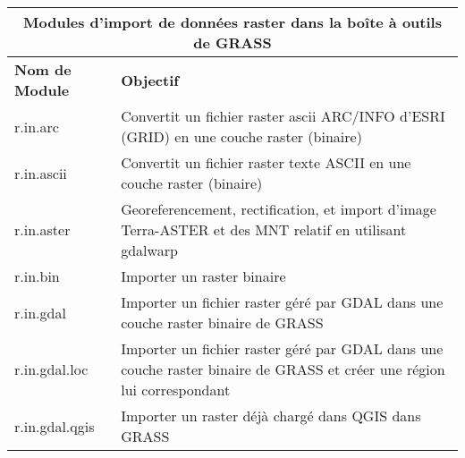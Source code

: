 \begin{table}[H]
\centering
 \begin{tabular}{|p{3cm}|p{11cm}|}
  \hline \multicolumn{2}{|c|}{\textbf{Modules d'import de données raster dans la boîte à outils de GRASS}} \\ 
  \hline \textbf{Nom de Module} & \textbf{Objectif} \\
   \hline r.in.arc & Convertit un fichier raster ascii ARC/INFO d'ESRI (GRID) en une couche raster (binaire) \\
  \hline r.in.ascii & Convertit un fichier raster texte ASCII en une couche raster (binaire)\\
  \hline r.in.aster & Georeferencement, rectification, et import d'image Terra-ASTER et des MNT relatif en utilisant gdalwarp \\
   \hline r.in.bin & Importer un raster binaire \\
   \hline r.in.gdal &  Importer un fichier raster géré par GDAL dans une couche raster binaire de GRASS\\
  \hline r.in.gdal.loc &  Importer un fichier raster géré par GDAL dans une couche raster binaire de GRASS et créer une région lui correspondant\\
  \hline r.in.gdal.qgis & Importer un raster déjà chargé dans QGIS dans GRASS \\

\end{tabular}
\end{table}
